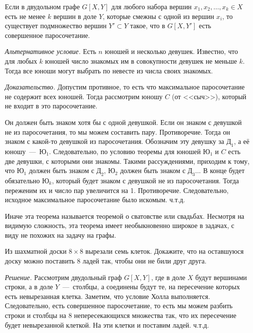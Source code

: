 \begin{theorem}[Холла]
	Если в двудольном графе $G[X, Y]$ для любого набора вершин $x_1, x_2, \dots, x_k \in X$ есть не менее $k$ вершин в доле $Y$, 
	которые смежны с одной из вершин $x_i$, то существует подмножество вершин $Y' \subset Y$ такое, что в $G[X, Y']$ есть совершенное паросочетание.
	
	\emph{Альтернативное условие.} Есть $n$ юношей и несколько девушек. Известно, что для любых $k$ юношей 
	число знакомых им в совокупности девушек не меньше $k$. Тогда все юноши могут выбрать по невесте из числа своих знакомых.
	
	\emph{Доказательство.} Допустим противное, то есть что максимальное паросочетание не содержит всех юношей. 
	Тогда рассмотрим юношу $C$ (от <<сыч>>), который не входит в это паросочетание.
	
	Он должен быть знаком хотя бы с одной девушкой. Если он знаком с девушкой не из паросочетания, то мы можем составить пару. 
	Противоречие. Тогда он знаком с какой-то девушкой из паросочетания. Обозначим эту девушку за $Д_1$, а её юношу~---~$Ю_1$. 
	Следовательно, по условию теоремы для юношей $Ю_1$ и $C$ есть две девушки, с которыми они знакомы. 
	Такими рассуждениями, приходим к тому, что $Ю_1$ должен быть знаком с $Д_2$, $Ю_2$ должен быть знаком с $Д_3$... 
	В конце будет обязательно $Ю_k$, который будет знаком с девушкой не из паросочетания. 
	Тогда переженим их и число пар увеличится на 1. Противоречие. Следовательно, исходное максимальное паросочетание было искомым. ч.т.д. 
\end{theorem}

	Иначе эта теорема называется теоремой о сватовстве или свадьбах. Несмотря на видимую сложность, эта теорема имеет необыкновенно широкое в задачах, с виду не похожих на задачу на графы.
	
\begin{example}
	Из шахматной доски $8 \times 8$ вырезали семь клеток. Докажите, что на оставшуюся доску можно поставить $8$ ладей так, 
	чтобы они не били друг друга.
	
	\emph{Решение.} Рассмотрим двудольный граф $G[X, Y]$, где в доле $X$ будут вершинами строки, а в доле $Y$~---~столбцы, 
	а соединены будут те, на пересечение которых есть невырезанная клетка. Заметим, что условие Холла выполняется. 
	Следовательно, есть совершенное паросочетание, то есть мы можем разбить строки и столбцы на $8$ непересекающихся 
	множества так, что их пересечение будет невырезанной клеткой. На эти клетки и поставим ладей. ч.т.д.
\end{example}

